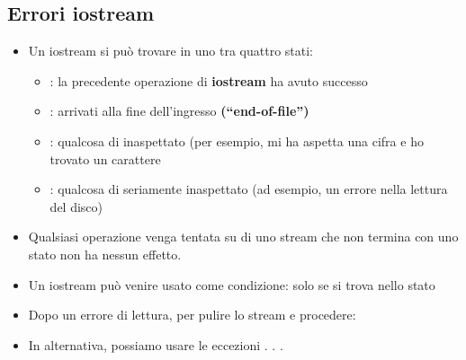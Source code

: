 \subsection{Errori iostream}
\begin{itemize}
    \item Un iostream si può trovare in uno tra quattro stati:
    \begin{itemize}
        \item \textbf{\textcolor{blue}{}} : la precedente operazione di \textbf{iostream} ha avuto successo\newline
        \item \textbf{\textcolor{blue}{}} : arrivati alla fine dell’ingresso \textbf{(“end-of-file”)}\newline
        \item \textbf{\textcolor{blue}{}} : qualcosa di inaspettato (per esempio, mi ha aspetta una cifra e ho trovato un carattere\newline
        \item \textbf{\textcolor{blue}{}} : qualcosa di seriamente inaspettato (ad
        esempio, un errore nella lettura del disco)
    \end{itemize}
    \item Qualsiasi operazione venga tentata su di uno stream che
    non termina con uno stato  non ha nessun effetto.
    \item Un iostream può venire usato come condizione: 
    solo se si trova nello stato 
    \item Dopo un errore di lettura, per pulire lo stream e procedere:
    
    \item  In alternativa, possiamo usare le eccezioni . . .    
\end{itemize}



%